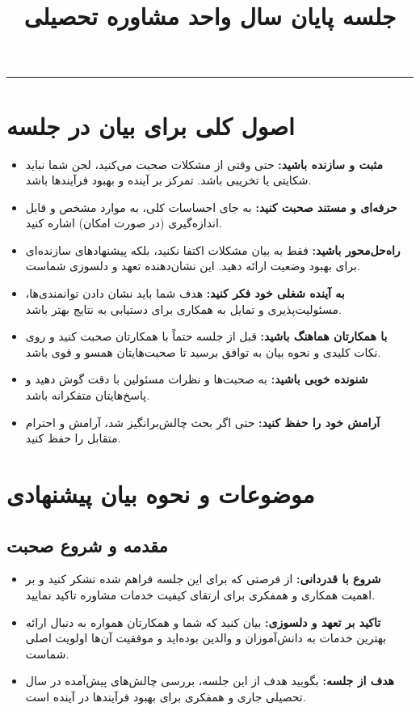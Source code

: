 \documentclass[12pt]{article}
\title{جلسه پایان سال واحد مشاوره تحصیلی}
\author{} %
\date{}
\begin{document}
\maketitle
\begin{center}
    \rule{0.8\textwidth}{0.4pt}
\end{center}
\vspace{1em}

\section*{اصول کلی برای بیان در جلسه}

\begin{itemize}
    \item \textbf{مثبت و سازنده باشید:} حتی وقتی از مشکلات صحبت می‌کنید، لحن شما نباید شکایتی یا تخریبی باشد. تمرکز بر آینده و بهبود فرآیندها باشد.
    \item \textbf{حرفه‌ای و مستند صحبت کنید:} به جای احساسات کلی، به موارد مشخص و قابل اندازه‌گیری (در صورت امکان) اشاره کنید.
    \item \textbf{راه‌حل‌محور باشید:} فقط به بیان مشکلات اکتفا نکنید، بلکه پیشنهادهای سازنده‌ای برای بهبود وضعیت ارائه دهید. این نشان‌دهنده تعهد و دلسوزی شماست.
    \item \textbf{به آینده شغلی خود فکر کنید:} هدف شما باید نشان دادن توانمندی‌ها، مسئولیت‌پذیری و تمایل به همکاری برای دستیابی به نتایج بهتر باشد.
    \item \textbf{با همکارتان هماهنگ باشید:} قبل از جلسه حتماً با همکارتان صحبت کنید و روی نکات کلیدی و نحوه بیان به توافق برسید تا صحبت‌هایتان همسو و قوی باشد.
    \item \textbf{شنونده خوبی باشید:} به صحبت‌ها و نظرات مسئولین با دقت گوش دهید و پاسخ‌هایتان متفکرانه باشد.
    \item \textbf{آرامش خود را حفظ کنید:} حتی اگر بحث چالش‌برانگیز شد، آرامش و احترام متقابل را حفظ کنید.
\end{itemize}

\section*{موضوعات و نحوه بیان پیشنهادی}

\subsection*{مقدمه و شروع صحبت}
\begin{itemize}
    \item \textbf{شروع با قدردانی:} از فرصتی که برای این جلسه فراهم شده تشکر کنید و بر اهمیت همکاری و همفکری برای ارتقای کیفیت خدمات مشاوره تاکید نمایید.
    \item \textbf{تاکید بر تعهد و دلسوزی:} بیان کنید که شما و همکارتان همواره به دنبال ارائه بهترین خدمات به دانش‌آموزان و والدین بوده‌اید و موفقیت آن‌ها اولویت اصلی شماست.
    \item \textbf{هدف از جلسه:} بگویید هدف از این جلسه، بررسی چالش‌های پیش‌آمده در سال تحصیلی جاری و همفکری برای بهبود فرآیندها در آینده است.
\end{itemize}
\end{document}
